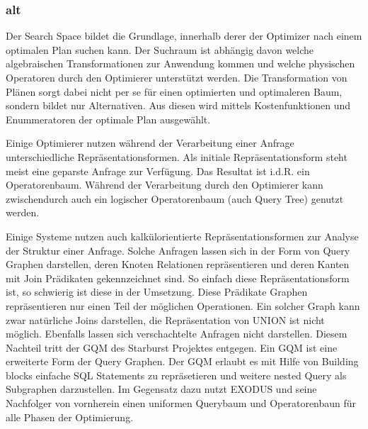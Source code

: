 \subsubsection{alt}




Der Search Space bildet die Grundlage, innerhalb derer der Optimizer nach einem optimalen Plan suchen kann. Der Suchraum ist abhängig davon welche algebraischen Transformationen zur Anwendung kommen und welche physischen Operatoren durch den Optimierer unterstützt werden. Die Transformation von Plänen sorgt dabei nicht per se für einen optimierten und optimaleren Baum, sondern bildet nur Alternativen. Aus diesen wird mittels Kostenfunktionen und Enummeratoren der optimale Plan ausgewählt.

Einige Optimierer nutzen während der Verarbeitung einer Anfrage unterschiedliche Repräsentationsformen. Als initiale Repräsentationsform steht meist eine geparste Anfrage zur Verfügung. Das Resultat ist i.d.R. ein Operatorenbaum. Während der Verarbeitung durch den Optimierer kann zwischendurch auch ein logischer Operatorenbaum (auch Query Tree) genutzt werden.

Einige Systeme nutzen auch kalkülorientierte Repräsentationsformen zur Analyse der Struktur einer Anfrage. Solche Anfragen lassen sich in der Form von Query Graphen darstellen, deren Knoten Relationen repräsentieren und deren Kanten mit Join Prädikaten gekennzeichnet sind. So einfach diese Repräsentationsform ist, so schwierig ist diese in der Umsetzung. Diese Prädikate Graphen repräsentieren nur einen Teil der möglichen Operationen. Ein solcher Graph kann zwar natürliche Joins darstellen, die Repräsentation von UNION ist nicht möglich. Ebenfalls lassen sich verschachtelte Anfragen nicht darstellen. Diesem Nachteil tritt der GQM des Starburst Projektes entgegen. Ein GQM ist eine erweiterte Form der Query Graphen. Der GQM erlaubt es mit Hilfe von Building blocks einfache SQL Statements zu repräsetieren und weitere nested Query als Subgraphen darzustellen. Im Gegensatz dazu nutzt EXODUS und seine Nachfolger von vornherein einen uniformen Querybaum und Operatorenbaun für alle Phasen der Optimierung.
